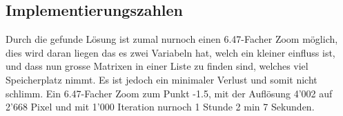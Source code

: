 \subsection{Implementierungszahlen}
Durch die gefunde Lösung ist zumal nurnoch einen 6.47-Facher Zoom möglich, dies wird daran liegen das es zwei Variabeln hat, welch ein kleiner einfluss ist, und dass nun grosse Matrixen in einer Liste zu finden sind, welches viel Speicherplatz nimmt. Es ist jedoch ein minimaler Verlust und somit nicht schlimm. Ein 6.47-Facher Zoom zum Punkt -1.5, mit der Auflösung 4'002 auf 2'668 Pixel und mit 1'000 Iteration nurnoch 1 Stunde 2 min 7 Sekunden.
